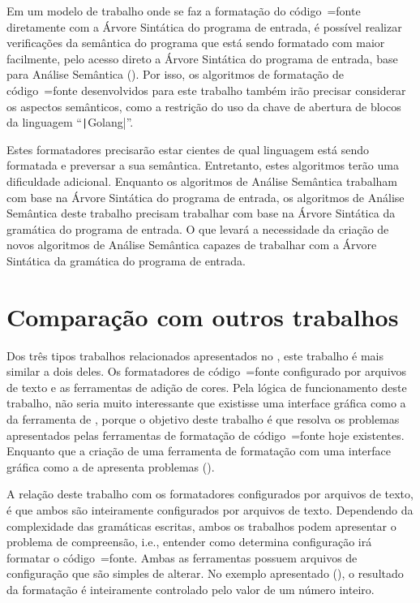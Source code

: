 Em um modelo de trabalho onde se faz a formatação do código~=fonte diretamente com a Árvore Sintática do programa de entrada,
é possível realizar verificações da semântica do programa que está sendo formatado com maior facilmente,
pelo acesso direto a Árvore Sintática do programa de entrada,
base para Análise Semântica ().
Por isso,
os algoritmos de formatação de código~=fonte desenvolvidos para este trabalho também irão precisar considerar os aspectos semânticos,
como a restrição do uso da chave de abertura de blocos da linguagem ``\texttt|Golang|''.

Estes formatadores precisarão estar cientes de qual linguagem está sendo formatada e
preversar a sua semântica.
Entretanto,
estes algoritmos terão uma dificuldade adicional.
Enquanto os algoritmos de Análise Semântica trabalham com base na Árvore Sintática do programa de entrada,
os algoritmos de Análise Semântica deste trabalho precisam trabalhar com base na Árvore Sintática da gramática do programa de entrada.
O que levará a necessidade da criação de novos algoritmos de Análise Semântica capazes de trabalhar com a Árvore Sintática da gramática do programa de entrada.


\section{Comparação com outros trabalhos}

Dos três tipos trabalhos relacionados apresentados no ,
este trabalho é mais similar a dois deles.
Os formatadores de código~=fonte configurado por arquivos de texto e
as ferramentas de adição de cores.
Pela lógica de funcionamento deste trabalho,
não seria muito interessante que existisse uma interface gráfica como a da ferramenta de ,
porque o objetivo deste trabalho é que resolva os problemas apresentados pelas ferramentas de formatação de código~=fonte hoje existentes.
Enquanto que a criação de uma ferramenta de formatação com uma interface gráfica como a de  apresenta problemas ().

A relação deste trabalho com os formatadores configurados por arquivos de texto,
é que ambos são inteiramente configurados por arquivos de texto.
Dependendo da complexidade das gramáticas escritas,
ambos os trabalhos podem apresentar o problema de compreensão,
i.e.,
entender como determina configuração irá formatar o código~=fonte.
Ambas as ferramentas possuem arquivos de configuração que são simples de alterar.
No exemplo apresentado (),
o resultado da formatação é inteiramente controlado pelo valor de um número inteiro.

